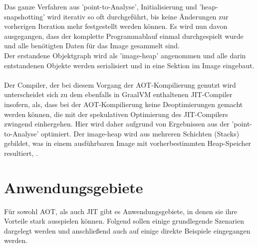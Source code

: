 Das ganze Verfahren aus 'point-to-Analyse', Initialisierung und 'heap-snapshotting' wird iterativ so oft durchgeführt, bis keine Änderungen zur vorherigen Iteration mehr festgestellt werden können. Es wird nun davon ausgegangen, dass der komplette Programmablauf einmal durchgespielt wurde und alle benötigten Daten für das Image gesammelt sind.\\
Der erstandene Objektgraph wird als 'image-heap' angenommen und alle darin entstandenen Objekte werden serialisiert und in eine Sektion im Image eingebaut. \\
\\
Der Compiler, der bei diesem Vorgang der \ac{AOT}-Kompilierung genutzt wird unterscheidet sich zu dem ebenfalls in GraalVM enthaltenen \ac{JIT}-Compiler insofern, als, dass bei der \ac{AOT}-Kompilierung keine Deoptimierungen gemacht werden können, die mit der spekulativen Optimierung des \ac{JIT}-Compilers zwingend einhergehen. Hier wird daher aufgrund von Ergebnissen aus der 'point-to-Analyse' optimiert. Der image-heap wird aus mehreren Schichten (Stacks) gebildet, was in einem ausführbaren Image mit vorherbestimmten Heap-Speicher resultiert, \cite[vgl. Sipek 2020, S.3]{Sipek_2020}.


\section{Anwendungsgebiete}
Für sowohl \ac{AOT}, als auch \ac{JIT} gibt es Anwendungsgebiete, in denen sie ihre Vorteile stark ausspielen können. Folgend sollen einige grundlegende Szenarien dargelegt werden und anschließend auch auf einige direkte Beispiele eingegangen werden.
